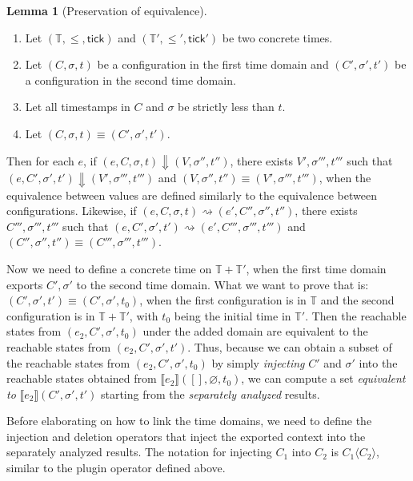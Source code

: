 \documentclass{article}
\theoremstyle{definition}
\newtheorem{lem}{Lemma}[section]
\newcommand*{\Time}{\mathbb{T}}
\newcommand*{\sembracket}[1]{\lBrack{#1}\rBrack}
\newcommand*{\tick}{\mathsf{tick}}
\newcommand*{\inject}[2]{{#1}\langle{#2}\rangle}
\begin{document}
\begin{lem}[Preservation of equivalence]
  $\:$

  \begin{enumerate}
    \item Let $(\Time,\le,\tick)$ and $(\Time',\le',\tick')$ be two concrete times.
    \item Let $(C,\sigma,t)$ be a configuration in the first time domain and $(C',\sigma',t')$ be a configuration in the second time domain.
    \item Let all timestamps in $C$ and $\sigma$ be strictly less than $t$.
    \item Let $(C,\sigma,t)\equiv (C',\sigma',t')$.
  \end{enumerate}

  Then for each $e$, if $(e,C,\sigma,t)\Downarrow(V,\sigma'',t'')$, there exists $V',\sigma''',t'''$ such that $(e,C',\sigma',t')\Downarrow(V',\sigma''',t''')$ and $(V,\sigma'',t'')\equiv(V',\sigma''',t''')$, when the equivalence between values are defined similarly to the equivalence between configurations.
  Likewise, if $(e,C,\sigma,t)\rightsquigarrow(e',C'',\sigma'',t'')$, there exists $C''',\sigma''',t'''$ such that $(e,C',\sigma',t')\rightsquigarrow(e',C''',\sigma''',t''')$ and $(C'',\sigma'',t'')\equiv(C''',\sigma''',t''')$.
\end{lem}

Now we need to define a concrete time on $\Time+\Time'$, when the first time domain exports $C',\sigma'$ to the second time domain.
What we want to prove that is: $(C',\sigma',t')\equiv(C',\sigma',t_{0})$, when the first configuration is in $\Time$ and the second configuration is in $\Time+\Time'$, with $t_{0}$ being the initial time in $\Time'$.
Then the reachable states from $(e_{2},C',\sigma',t_{0})$ under the added domain are equivalent to the reachable states from $(e_{2},C',\sigma',t')$.
Thus, because we can obtain a subset of the reachable states from $(e_{2},C',\sigma',t_{0})$ by simply \emph{injecting} $C'$ and $\sigma'$ into the reachable states obtained from $\sembracket{e_{2}}([],\varnothing,t_{0})$, we can compute a set \textit{equivalent to} $\sembracket{e_{2}}(C',\sigma',t')$ starting from the \emph{separately analyzed} results.

Before elaborating on how to link the time domains, we need to define the injection and deletion operators that inject the exported context into the separately analyzed results.
The notation for injecting $C_{1}$ into $C_{2}$ is $\inject{C_{1}}{C_{2}}$, similar to the plugin operator defined above.
\end{document}
